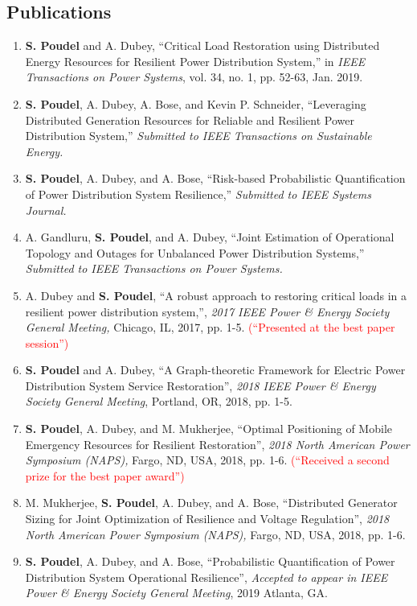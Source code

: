 \documentclass[12pt]{article}
\begin{document}
\subsection{Publications}
\small
\begin{enumerate}
    \item \textbf{S. Poudel} and A. Dubey, ``Critical Load Restoration using Distributed Energy Resources for Resilient Power Distribution System,'' in \textit{IEEE Transactions on Power Systems}, vol. 34, no. 1, pp. 52-63, Jan. 2019.
    \item \textbf{S. Poudel}, A. Dubey, A. Bose, and Kevin P. Schneider, ``Leveraging Distributed Generation Resources for Reliable and Resilient Power Distribution System,'' \textit{Submitted to IEEE Transactions on Sustainable Energy.}
    \item \textbf{S. Poudel}, A. Dubey, and A. Bose,  ``Risk-based Probabilistic Quantification of Power Distribution System Resilience,'' \textit{Submitted to IEEE Systems Journal.}
    
    \item A. Gandluru, \textbf{S. Poudel}, and A. Dubey,  ``Joint Estimation of Operational Topology and Outages for Unbalanced Power Distribution Systems,'' \textit{Submitted to IEEE Transactions on Power Systems.}
   \item A. Dubey and \textbf{S. Poudel}, “A robust approach to restoring critical loads in a resilient power distribution system,'', \textit{2017 IEEE Power \& Energy Society General Meeting,} Chicago, IL, 2017, pp. 1-5. \textcolor{red}{(``Presented at the best paper session'')}
    \item \textbf{S. Poudel} and A. Dubey, “A Graph-theoretic Framework for Electric Power Distribution System Service Restoration'', \textit{2018 IEEE Power \& Energy Society General Meeting}, Portland, OR, 2018, pp. 1-5.
    \item \textbf{S. Poudel}, A. Dubey, and M. Mukherjee, “Optimal Positioning of Mobile Emergency Resources for Resilient Restoration'', \textit{ 2018 North American Power Symposium (NAPS),} Fargo, ND, USA, 2018, pp. 1-6. \textcolor{red}{(``Received a second prize for the best paper award'')}
    \item M. Mukherjee, \textbf{S. Poudel}, A. Dubey, and A. Bose, “Distributed Generator Sizing for Joint Optimization of Resilience and Voltage Regulation'', \textit{ 2018 North American Power Symposium (NAPS),} Fargo, ND, USA, 2018, pp. 1-6.
    \item \textbf{S. Poudel}, A. Dubey, and A. Bose, “Probabilistic Quantification of Power Distribution System Operational Resilience'', \textit{Accepted to appear in IEEE Power \& Energy Society General Meeting}, 2019 Atlanta, GA.
    
\end{enumerate}    
\end{document}
